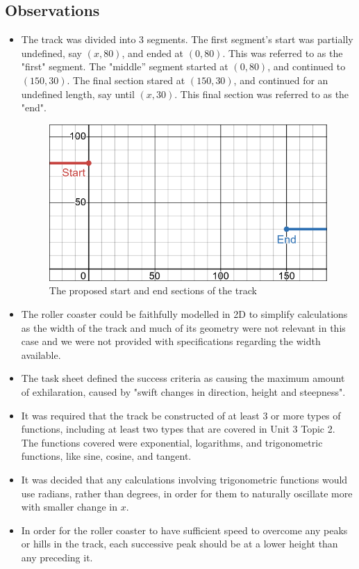 \documentclass[11pt, letterpaper]{article}
\begin{document}
\subsection{Observations}
\begin{itemize}

	\item The track was divided into 3 segments. The first segment's start was partially undefined, say $(x, 80)$, and ended at $(0, 80)$. This was referred to as the "first" segment. The "middle'' segment started at $(0, 80)$, and continued to $(150,30)$. The final section stared at $(150,30)$, and continued for an undefined length, say until $(x, 30)$. This final section was referred to as the "end".

		\begin{figure}[h]
		
		\begin{center}
		\includegraphics[width=15cm]{Start and End.png}

		\caption{The proposed start and end sections of the track}
		\end{center}


		\end{figure}

	\item The roller coaster could be faithfully modelled in 2D to simplify calculations as the width of the track and much of its geometry were not relevant in this case and we were not provided with specifications regarding the width available. 
	\item The task sheet defined the success criteria as causing the maximum amount of exhilaration, caused by "swift changes in direction, height and steepness". 
		
	\item It was required that the track be constructed of at least 3 or more types of functions, including at least two types that are covered in Unit 3 Topic 2. The functions covered were exponential, logarithms, and trigonometric functions, like sine, cosine, and tangent.
	\item It was decided that any calculations involving trigonometric functions would use radians, rather than degrees, in order for them to naturally oscillate more with smaller change in $x$.
	\item In order for the roller coaster to have sufficient speed to overcome any peaks or hills in the track, each successive peak should be at a lower height than any preceding it.

\end{itemize}
\end{document}

